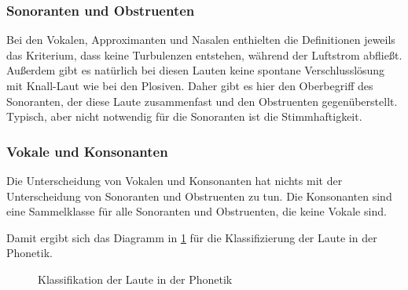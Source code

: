 \subsubsection{Sonoranten und Obstruenten}

Bei den Vokalen, Approximanten und Nasalen enthielten die Definitionen jeweils das Kriterium, dass keine Turbulenzen entstehen, während der Luftstrom abfließt.
Außerdem gibt es natürlich bei diesen Lauten keine spontane Verschlusslösung mit Knall-Laut wie bei den Plosiven.
Daher gibt es hier den Oberbegriff des Sonoranten, der diese Laute zusammenfast und den Obstruenten gegenüberstellt.
Typisch, aber nicht notwendig für die Sonoranten ist die Stimmhaftigkeit.

\newpage



\subsubsection{Vokale und Konsonanten}

Die Unterscheidung von Vokalen und Konsonanten hat nichts mit der Unterscheidung von Sonoranten und Obstruenten zu tun.
Die Konsonanten sind eine Sammelklasse für alle Sonoranten und Obstruenten, die keine Vokale sind.


Damit ergibt sich das Diagramm in \ref{fig:lautklassen} für die Klassifizierung der Laute in der Phonetik.

\begin{figure}[!h]
  \centering
  \caption{Klassifikation der Laute in der Phonetik}
  \label{fig:lautklassen}
\end{figure}


